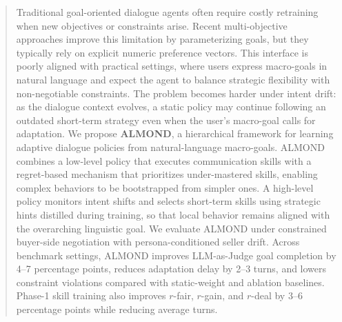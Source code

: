 \begin{abstract}
Traditional goal-oriented dialogue agents often require costly retraining when
new objectives or constraints arise. Recent multi-objective approaches improve
this limitation by parameterizing goals, but they typically rely on explicit
numeric preference vectors. This interface is poorly aligned with practical
settings, where users express macro-goals in natural language and expect the
agent to balance strategic flexibility with non-negotiable constraints. The
problem becomes harder under intent drift: as the dialogue context evolves, a
static policy may continue following an outdated short-term strategy even when
the user's macro-goal calls for adaptation. We propose \textbf{ALMOND}, a
hierarchical framework for learning adaptive dialogue policies from
natural-language macro-goals. ALMOND combines a low-level policy that executes
communication skills with a regret-based mechanism that prioritizes
under-mastered skills, enabling complex behaviors to be bootstrapped from
simpler ones. A high-level policy monitors intent shifts and selects
short-term skills using strategic hints distilled during training, so that
local behavior remains aligned with the overarching linguistic goal. We
evaluate ALMOND under constrained buyer-side negotiation with
persona-conditioned seller drift. Across benchmark settings, ALMOND improves
LLM-as-Judge goal completion by 4--7 percentage points, reduces adaptation
delay by 2--3 turns, and lowers constraint violations compared with
static-weight and ablation baselines. Phase-1 skill training also improves
$r$-fair, $r$-gain, and $r$-deal by 3--6 percentage points while reducing
average turns.
\end{abstract}
